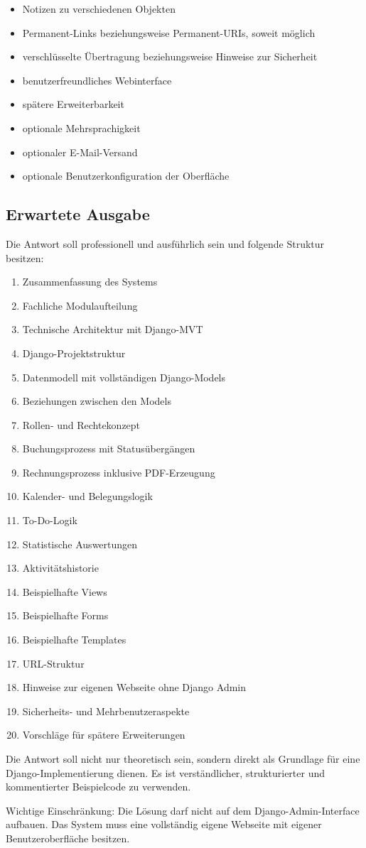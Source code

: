 \begin{itemize}
\item Notizen zu verschiedenen Objekten
\item Permanent-Links beziehungsweise Permanent-URIs, soweit möglich
\item verschlüsselte Übertragung beziehungsweise Hinweise zur Sicherheit
\item benutzerfreundliches Webinterface
\item spätere Erweiterbarkeit
\item optionale Mehrsprachigkeit
\item optionaler E-Mail-Versand
\item optionale Benutzerkonfiguration der Oberfläche
\end{itemize}

\subsection{Erwartete Ausgabe}

Die Antwort soll professionell und ausführlich sein und folgende Struktur besitzen:

\begin{enumerate}
\item Zusammenfassung des Systems
\item Fachliche Modulaufteilung
\item Technische Architektur mit Django-MVT
\item Django-Projektstruktur
\item Datenmodell mit vollständigen Django-Models
\item Beziehungen zwischen den Models
\item Rollen- und Rechtekonzept
\item Buchungsprozess mit Statusübergängen
\item Rechnungsprozess inklusive PDF-Erzeugung
\item Kalender- und Belegungslogik
\item To-Do-Logik
\item Statistische Auswertungen
\item Aktivitätshistorie
\item Beispielhafte Views
\item Beispielhafte Forms
\item Beispielhafte Templates
\item URL-Struktur
\item Hinweise zur eigenen Webseite ohne Django Admin
\item Sicherheits- und Mehrbenutzeraspekte
\item Vorschläge für spätere Erweiterungen
\end{enumerate}

Die Antwort soll nicht nur theoretisch sein, sondern direkt als Grundlage für eine Django-Implementierung dienen. Es ist verständlicher, strukturierter und kommentierter Beispielcode zu verwenden.

Wichtige Einschränkung: Die Lösung darf nicht auf dem Django-Admin-Interface aufbauen. Das System muss eine vollständig eigene Webseite mit eigener Benutzeroberfläche besitzen.
